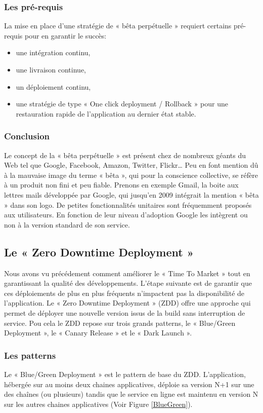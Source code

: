       \subsubsection{Les pré-requis}
      La mise en place d’une stratégie de « bêta perpétuelle » requiert certains pré-requis pour en garantir le succès:\\
      \begin{itemize}
        \item une intégration continu,
        \item une livraison continue,
        \item un déploiement continu,
        \item une stratégie de type « One click deployment / Rollback » pour une restauration rapide de l’application au dernier état stable.\\
      \end{itemize}

      \subsubsection{Conclusion}
      Le concept de la « bêta perpétuelle » est présent chez de nombreux géants du Web tel que Google, Facebook, Amazon, Twitter, Flickr… Peu en font mention dû à la mauvaise image du terme « bêta », qui pour la conscience collective, se réfère à un produit non fini et peu fiable. Prenons en exemple Gmail, la boite aux lettres mails développée par Google, qui jusqu’en 2009 intégrait la mention « bêta » dans son logo. De petites fonctionnalités unitaires sont fréquemment proposés aux utilisateurs. En fonction de leur niveau d’adoption Google les intègrent ou non à la version standard de son service.

      \subsection{Le « Zero Downtime Deployment »}
      Nous avons vu précédement comment améliorer le « Time To Market » tout en garantissant la qualité des développements. L'étape suivante est de garantir que ces déploiements de plus en plus fréquents n'impactent pas la disponibilité de l'application. Le « Zero Downtime Deployment » (ZDD) offre une approche qui permet de déployer une nouvelle version issus de la build sans interruption de service. Pou cela le ZDD repose sur trois grands patterns, le « Blue/Green Deployment », le « Canary Release » et le « Dark Launch ».
        \subsubsection{Les patterns}
        Le « Blue/Green Deployment » est le pattern de base du ZDD. L’application, hébergée sur au moins deux chaines applicatives, déploie sa version N+1 sur une des chaînes (ou plusieurs) tandis que le service en ligne est maintenu en version N sur les autres chaines applicatives (Voir Figure \ref{BlueGreen}).\\

